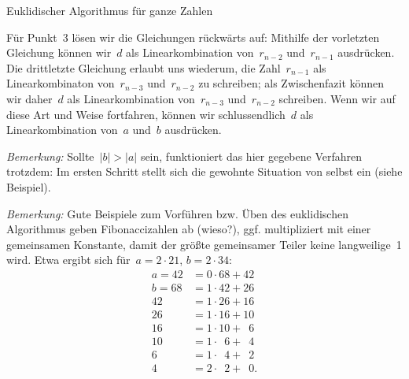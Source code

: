 \documentclass{algblatt}
\begin{document}
\begin{aufgabe}{Euklidischer Algorithmus für ganze Zahlen}
\begin{loesung}
Für Punkt~3 lösen wir die Gleichungen rückwärts auf: Mithilfe der vorletzten
Gleichung können wir~$d$ als Linearkombination von~$r_{n-2}$ und~$r_{n-1}$
ausdrücken. Die drittletzte Gleichung erlaubt uns wiederum, die Zahl~$r_{n-1}$
als Linearkombinaton von~$r_{n-3}$ und~$r_{n-2}$ zu schreiben; als
Zwischenfazit können wir daher~$d$ als Linearkombination von~$r_{n-3}$
und~$r_{n-2}$ schreiben. Wenn wir auf diese Art und Weise fortfahren, können
wir schlussendlich~$d$ als Linearkombination von~$a$ und~$b$ ausdrücken.

\emph{Bemerkung:} Sollte~$|b| > |a|$ sein, funktioniert das hier gegebene
Verfahren trotzdem: Im ersten Schritt stellt sich die gewohnte Situation von
selbst ein (siehe Beispiel).

\emph{Bemerkung:} Gute Beispiele zum Vorführen bzw. Üben des euklidischen
Algorithmus geben Fibonaccizahlen ab (wieso?), ggf. multipliziert mit einer
gemeinsamen Konstante, damit der größte gemeinsamer Teiler keine langweilige~1
wird. Etwa ergibt sich für~$a = 2 \cdot 21$, $b = 2 \cdot 34$:
\begin{align*}
  a = 42 &= 0 \cdot 68 + 42 \\
  b = 68 &= 1 \cdot 42 + 26 \\
  42 &= 1 \cdot 26 + 16 \\
  26 &= 1 \cdot 16 + 10 \\
  16 &= 1 \cdot 10 + \phantom{0}6 \\
  10 &= 1 \cdot \phantom{0}6 + \phantom{0}4 \\
   6 &= 1 \cdot \phantom{0}4 + \phantom{0}2 \\
   4 &= 2 \cdot \phantom{0}2 + \phantom{0}0.
\end{align*}
\end{loesung}
\end{aufgabe}
 
\end{document}
